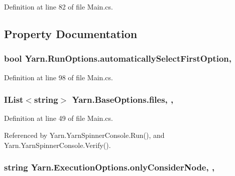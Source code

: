 Definition at line 82 of file Main.\-cs.



\subsection{Property Documentation}
\hypertarget{a00144_ae21d271c37dabee023771a951f6e774e}{
\subsubsection[{automatically\-Select\-First\-Option}]{\setlength{\rightskip}{0pt plus 5cm}bool Yarn.\-Run\-Options.\-automatically\-Select\-First\-Option\hspace{0.3cm}{\ttfamily [get]}, {\ttfamily [set]}}}\label{a00144_ae21d271c37dabee023771a951f6e774e}


Definition at line 98 of file Main.\-cs.

\hypertarget{a00042_aa93cbb1bc1d5328e0a417012621e92d2}{
\subsubsection[{files}]{\setlength{\rightskip}{0pt plus 5cm}I\-List$<$string$>$ Yarn.\-Base\-Options.\-files\hspace{0.3cm}{\ttfamily [get]}, {\ttfamily [set]}, {\ttfamily [inherited]}}}\label{a00042_aa93cbb1bc1d5328e0a417012621e92d2}


Definition at line 49 of file Main.\-cs.



Referenced by Yarn.\-Yarn\-Spinner\-Console.\-Run(), and Yarn.\-Yarn\-Spinner\-Console.\-Verify().

\hypertarget{a00101_af4c0062a1d46281d377f87084fde374e}{
\subsubsection[{only\-Consider\-Node}]{\setlength{\rightskip}{0pt plus 5cm}string Yarn.\-Execution\-Options.\-only\-Consider\-Node\hspace{0.3cm}{\ttfamily [get]}, {\ttfamily [set]}, {\ttfamily [inherited]}}}\label{a00101_af4c0062a1d46281d377f87084fde374e}


